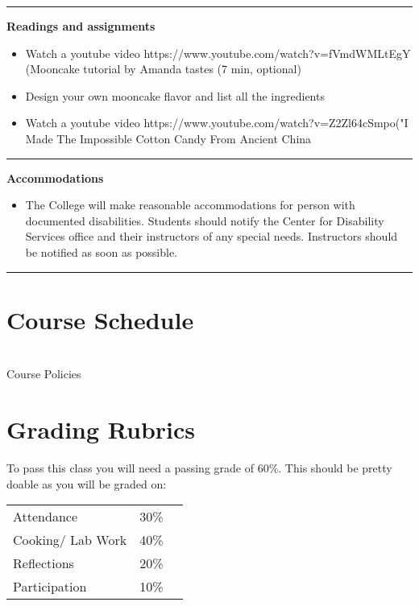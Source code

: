 \documentclass{article}
\begin{document}
 \vspace{0.5em}
  \par\noindent\rule{\textwidth}{0.4pt}
  
\noindent\textbf{Readings and assignments}
\begin{itemize}
\item Watch a youtube video https://www.youtube.com/watch?v=fVmdWMLtEgY (Mooncake tutorial by Amanda tastes (7 min, optional)
\item Design your own mooncake flavor and list all the ingredients 
\item Watch a youtube video https://www.youtube.com/watch?v=Z2Zl64cSmpo("I Made The Impossible Cotton Candy From Ancient China 
\end{itemize}
  \par\noindent\rule{\textwidth}{0.4pt}
\textbf{Accommodations }
\begin{itemize}
\vspace{0.5em} 
\item\noindent The College will make reasonable accommodations for person with documented disabilities. Students should notify the Center for Disability Services office and their instructors of any special needs. Instructors should be notified as soon as possible.

 \end{itemize}
  \par\noindent\rule{\textwidth}{0.4pt}
 \section*{Course Schedule }\\
Course Policies

\section{Grading Rubrics} 


To pass this class you will need a passing grade of 60\%. This should be pretty doable as you will be graded on:

\begin{table}[h]
\begin{tabular}{lll}
 Attendance &  30\% \\
 Cooking/ Lab Work & 40\%  \\
 Reflections &  20\%  \\
 Participation & 10\% \\ 
\end{tabular}
\end{table}   
\end{document}
